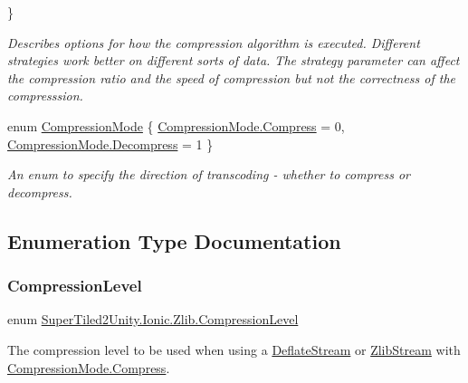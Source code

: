 \begin{DoxyCompactItemize}
 \}
\begin{DoxyCompactList}\small\item\em Describes options for how the compression algorithm is executed. Different strategies work better on different sorts of data. The strategy parameter can affect the compression ratio and the speed of compression but not the correctness of the compresssion. \end{DoxyCompactList}\item 
enum \mbox{\hyperlink{namespace_super_tiled2_unity_1_1_ionic_1_1_zlib_ad5b7635d92497e1c905e5de82eb1c6b1}{Compression\+Mode}} \{ \mbox{\hyperlink{namespace_super_tiled2_unity_1_1_ionic_1_1_zlib_ad5b7635d92497e1c905e5de82eb1c6b1a8fa4fcfcda70410e089984d5f51ae97d}{Compression\+Mode.\+Compress}} = 0, 
\mbox{\hyperlink{namespace_super_tiled2_unity_1_1_ionic_1_1_zlib_ad5b7635d92497e1c905e5de82eb1c6b1a6d2861192fdf4370bcf95c099be0f2f0}{Compression\+Mode.\+Decompress}} = 1
 \}
\begin{DoxyCompactList}\small\item\em An enum to specify the direction of transcoding -\/ whether to compress or decompress. \end{DoxyCompactList}\end{DoxyCompactItemize}


\subsection{Enumeration Type Documentation}
\mbox{\label{namespace_super_tiled2_unity_1_1_ionic_1_1_zlib_a20f6771804996c363f454ad9765cd7db}} 
\subsubsection{\texorpdfstring{Compression\+Level}{CompressionLevel}}
{\footnotesize\ttfamily enum \mbox{\hyperlink{namespace_super_tiled2_unity_1_1_ionic_1_1_zlib_a20f6771804996c363f454ad9765cd7db}{Super\+Tiled2\+Unity.\+Ionic.\+Zlib.\+Compression\+Level}}\hspace{0.3cm}{\ttfamily [strong]}}



The compression level to be used when using a \mbox{\hyperlink{class_super_tiled2_unity_1_1_ionic_1_1_zlib_1_1_deflate_stream}{Deflate\+Stream}} or \mbox{\hyperlink{class_super_tiled2_unity_1_1_ionic_1_1_zlib_1_1_zlib_stream}{Zlib\+Stream}} with \mbox{\hyperlink{namespace_super_tiled2_unity_1_1_ionic_1_1_zlib_ad5b7635d92497e1c905e5de82eb1c6b1a8fa4fcfcda70410e089984d5f51ae97d}{Compression\+Mode.\+Compress}}. 


